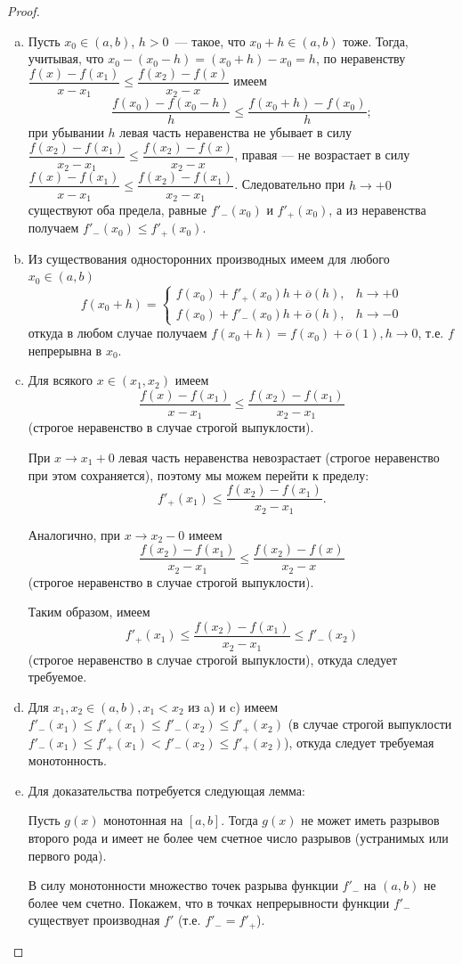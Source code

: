 \documentclass[12pt]{article}
\begin{document}
	\begin{proof}
		\begin{enumerate}[a)]
			\item Пусть $x_0 \in (a, b)$, $h > 0$~--- такое, что $x_0 + h \in (a, b)$ тоже. Тогда, учитывая, что $x_0 - (x_0 - h) = (x_0 + h) - x_0 = h$, по неравенству $\dfrac{f(x) - f(x_1)}{x - x_1} \leqslant \dfrac{f(x_2) - f(x)}{x_2 - x}$ имеем
			\[
			\frac{f(x_0) - f(x_0 - h)}{h} \leqslant \frac{f(x_0 + h) - f(x_0)}{h};
			\]
			при убывании $h$ левая часть неравенства не убывает в силу $\dfrac{f(x_2) - f(x_1)}{x_2 - x_1} \leqslant \dfrac{f(x_2) - f(x)}{x_2 - x}$, правая — не возрастает в силу $\dfrac{f(x) - f(x_1)}{x - x_1} \leqslant \dfrac{f(x_2) - f(x_1)}{x_2 - x_1}$. Следовательно при $h \to +0$ существуют оба предела, равные $f'_-(x_0)$ и $f'_+(x_0)$, а из неравенства получаем $f'_-(x_0) \leqslant f'_+(x_0)$.
			\item Из существования односторонних производных имеем для любого $x_0 \in (a, b)$
			\[
			f(x_0 + h) = 
			\begin{cases}
				f(x_0) + f'_+(x_0)h + \overline{o}(h), & h \to +0 \\
				f(x_0) + f'_-(x_0)h + \overline{o}(h), & h \to -0
			\end{cases}
			\]
			откуда в любом случае получаем $f(x_0 + h) = f(x_0) + \overline{o}(1), h \to 0$, т.е. $f$ непрерывна в $x_0$.
			\item Для всякого $x \in (x_1, x_2)$ имеем
			\[
			\frac{f(x) - f(x_1)}{x - x_1} \leqslant \frac{f(x_2) - f(x_1)}{x_2 - x_1}
			\]
			(строгое неравенство в случае строгой выпуклости).
			
			При $x \to x_1 + 0$ левая часть неравенства невозрастает (строгое неравенство при этом сохраняется), поэтому мы можем перейти к пределу:
			\[
			f'_+(x_1) \leqslant \frac{f(x_2) - f(x_1)}{x_2 - x_1}.
			\]
			
			Аналогично, при $x \to x_2 - 0$ имеем
			\[
			\frac{f(x_2) - f(x_1)}{x_2 - x_1} \leqslant \frac{f(x_2) - f(x)}{x_2 - x}
			\]
			(строгое неравенство в случае строгой выпуклости).
			
			Таким образом, имеем
			\[
			f'_+(x_1) \leqslant \frac{f(x_2) - f(x_1)}{x_2 - x_1} \leqslant f'_-(x_2)
			\]
			(строгое неравенство в случае строгой выпуклости), откуда следует требуемое.
			\item Для $x_1, x_2 \in (a, b), x_1 < x_2$ из a) и c) имеем $f'_-(x_1) \leqslant f'_+(x_1) \leqslant f'_-(x_2) \leqslant f'_+(x_2)$ (в случае строгой выпуклости $f'_-(x_1) \leqslant f'_+(x_1) < f'_-(x_2) \leqslant f'_+(x_2)$), откуда следует требуемая монотонность.
			\item Для доказательства потребуется следующая лемма:
			\begin{lemma}
				Пусть $g(x)$ монотонная на $[a, b]$. Тогда $g(x)$ не может иметь разрывов второго рода и имеет не более чем счетное число разрывов (устранимых или первого рода).
			\end{lemma}
			В силу монотонности множество точек разрыва функции $f'_-$ на $(a, b)$ не более чем счетно. Покажем, что в точках непрерывности функции $f'_-$ существует производная $f'$ (т.е. $f'_- = f'_+$). 
			

\end{enumerate}
\end{proof}
\end{document}

